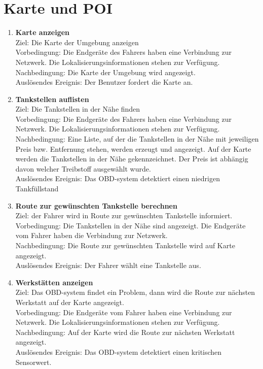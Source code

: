 \documentclass[pflichtenheft.tex]{subfiles}
\begin{document}
	
	\section{Karte und POI}
	
	\begin{enumerate}
	\setcounter{enumi}{\value{enumTemp}}
	\item{\textbf{Karte anzeigen}}
		\\Ziel: Die Karte der Umgebung anzeigen
		\\Vorbedingung: Die Endgeräte des Fahrers haben eine Verbindung zur Netzwerk.
		Die Lokalisierungsinformationen stehen zur Verfügung.
		\\Nachbedingung: Die Karte der Umgebung wird angezeigt.
  	 	\\Auslösendes Ereignis: Der Benutzer fordert die Karte an.
  	\item {\textbf{Tankstellen auflisten}}
		\\Ziel: Die Tankstellen in der Nähe finden
		\\Vorbedingung: Die Endgeräte des Fahrers haben eine Verbindung zur Netzwerk.
		Die Lokalisierungsinformationen stehen zur Verfügung.
		\\Nachbedingung: Eine Liste, auf der die Tankstellen in der Nähe mit
		jeweiligen Preis bzw. Entfernung stehen, werden erzeugt und angezeigt. Auf der
		Karte werden die Tankstellen in der Nähe gekennzeichnet. 
		Der Preis ist abhängig davon welcher Treibstoff ausgewählt wurde.
		\\Auslösendes Ereignis: Das OBD-system detektiert einen niedrigen
		Tankfüllstand
  	
  	\item {\textbf{Route zur gewünschten Tankstelle berechnen}}
  		\\Ziel: der Fahrer wird in Route zur gewünschten Tankstelle informiert. 
  		\\Vorbedingung: Die Tankstellen in der Nähe sind angezeigt. Die Endgeräte
  		vom Fahrer haben die Verbindung zur Netzwerk.
  		\\Nachbedingung: Die Route zur gewünschten Tankstelle wird auf Karte
  		angezeigt.
   		\\Auslösendes Ereignis: Der Fahrer wählt eine Tankstelle aus.
  
	\item{\textbf{Werkstätten anzeigen}} 
		\\Ziel: Das OBD-system findet ein Problem, dann wird die Route zur nächsten
		Werkstatt auf der Karte angezeigt.
		\\Vorbedingung: Die Endgeräte vom Fahrer haben eine Verbindung zur Netzwerk.
		Die Lokalisierungsinformationen stehen zur Verfügung.
		\\Nachbedingung: Auf der Karte wird die Route zur nächsten Werkstatt
		angezeigt.
	 	\\Auslösendes Ereignis: Das OBD-system detektiert einen kritischen Sensorwert.

	\setcounter{enumTemp}{\value{enumi}}
	\end{enumerate}
\end{document}
